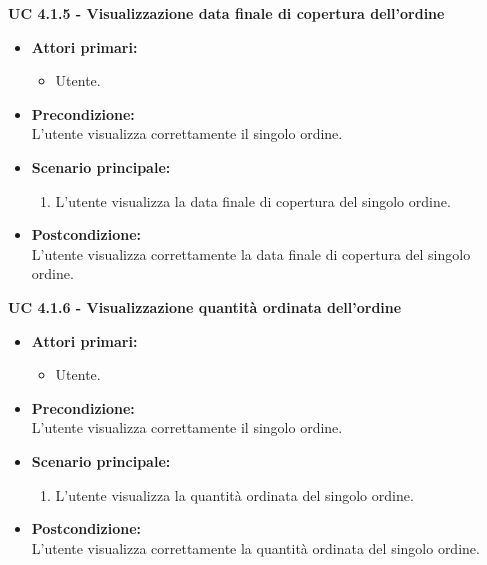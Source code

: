 \vspace{0.4cm}

\noindent \textbf{\large UC 4.1.5 - Visualizzazione data finale di copertura dell'ordine}
\label{uc:visualizzazione-data-finale-copertura}
\begin{itemize}

	\item \textbf{Attori primari: }
		\begin{itemize}
			\item Utente.
		\end{itemize}

	\item \textbf{Precondizione: }\\[0.3cm]
		L'utente visualizza correttamente il singolo ordine.

	\item \textbf{Scenario principale: }
		\begin{enumerate}
			\item L'utente visualizza la data finale di copertura del singolo ordine.
		\end{enumerate}
		

	\item \textbf{Postcondizione: }\\[0.3cm]
		L'utente visualizza correttamente la data finale di copertura del singolo ordine.

\end{itemize}

\vspace{0.4cm}

\newpage

\noindent \textbf{\large UC 4.1.6 - Visualizzazione quantità ordinata dell'ordine}
\label{uc:visualizzazione-quantita-ordinata}
\begin{itemize}

	\item \textbf{Attori primari: }
		\begin{itemize}
			\item Utente.
		\end{itemize}

	\item \textbf{Precondizione: }\\[0.3cm]
		L'utente visualizza correttamente il singolo ordine.

	\item \textbf{Scenario principale: }
		\begin{enumerate}
			\item L'utente visualizza la quantità ordinata del singolo ordine.
		\end{enumerate}
		

	\item \textbf{Postcondizione: }\\[0.3cm]
		L'utente visualizza correttamente la quantità ordinata del singolo ordine.

\end{itemize}

